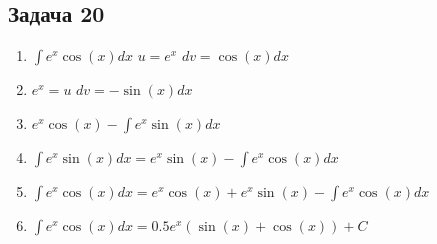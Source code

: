 \documentclass[a4paper,12pt]{article}
\begin{document}
\subsection{Задача 20}
\begin{enumerate}
    \item $\int e^x \cos(x)dx$ $u = e^x$ $dv = \cos(x) dx$
    \item $e^x=u$ $dv = -\sin(x)dx$
    \item $e^x\cos(x)-\int e^x\sin(x)dx$
    \item $\int e^x \sin(x)dx = e^x\sin(x)-\int e^x \cos(x)dx$
    \item $\int e^x\cos(x)dx = e^x\cos(x) + e^x\sin(x) - \int e^x\cos(x)dx$
    \item $\int e^x\cos(x)dx = 0.5e^x(\sin(x)+\cos(x)) + C$
\end{enumerate}
\end{document}
